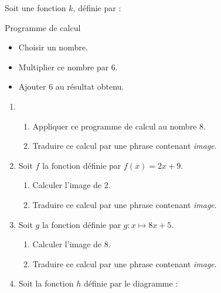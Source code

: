 \begin{exercice}
    Soit une fonction $k$, définie par :
    \begin{myBox}{Programme de calcul}
        \begin{itemize}
            \item Choisir un nombre.
            \item Multiplier ce nombre par $6$.
            \item Ajouter $6$ au résultat obtenu.
        \end{itemize}
    \end{myBox}
    \begin{enumerate}
        \item 
        \begin{enumerate}
            \item Appliquer ce programme de calcul au nombre $8$.
            \item Traduire ce calcul par une phrase contenant \textit{image}.
        \end{enumerate}        
        \item Soit $f$ la fonction définie par $f(x)= 2x+9$.
        \begin{enumerate}
            \item Calculer l'image de $2$.
            \item Traduire ce calcul par une phrase contenant \textit{image}.
        \end{enumerate}
        \item Soit $g$ la fonction définie par $g:x\longmapsto 8x+5$.
        \begin{enumerate}
        \item Calculer l'image de $8$.
        \item Traduire ce calcul par une phrase contenant \textit{image}.
    \end{enumerate}
    
        \item Soit la fonction $h$ définie par le diagramme :
        

\end{enumerate}
\end{exercice}
